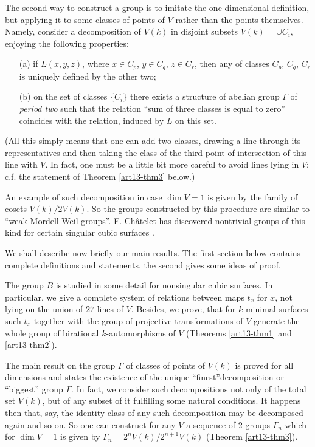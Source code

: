 The second way to construct a group is to imitate the one-dimensional definition, but applying it to some classes of points of $V$ rather than the points themselves. Namely, consider a decomposition of $V(k)$ in disjoint subsets $V(k)=\cup C_{i}$, enjoying the following properties:
\begin{itemize}
\item[(a)] if $L(x,y,z)$, where $x\in C_{p}$, $y\in C_{q}$, $z\in C_{r}$, then any of classes $C_{p}$, $C_{q}$, $C_{r}$ is uniquely defined by the other two;

\item[(b)] on the set of classes $\{C_{i}\}$ there exists a structure of abelian group $\Gamma$ of {\em period two} such that the relation ``sum of three classes is equal to zero'' coincides with the relation, induced by $L$ on this set.
\end{itemize}

(All this simply means that one can add two classes, drawing a line through its representatives and then taking the class of the third point of intersection of this line with $V$. In fact, one must be a little bit more careful to avoid lines lying in $V$: c.f. the statement of Theorem \ref{art13-thm3} below.)

An example of such decomposition in case $\dim V=1$ is given by the family of cosets $V(k)/2V(k)$. So the groups constructed by this procedure are similar to ``weak Mordell-Weil groups''. F. Ch\^atelet has discovered nontrivial groups of this kind for certain singular cubic surfaces \cite{art13-key1}.

We shall describe now briefly our main results. The first section below contains complete definitions and statements, the second gives some ideas of proof.

The group $B$ is studied in some detail for nonsingular cubic surfaces. In particular, we give a complete system of relations between maps $t_{x}$ for $x$, not lying on the union of $27$ lines of $V$. Besides, we prove, that for $k$-minimal surfaces such $t_{x}$ together with the group of projective transformations of $V$ generate the whole group of birational $k$-automorphisms of $V$ (Theorems \ref{art13-thm1} and \ref{art13-thm2}).

The main result on the group $\Gamma$ of classes of points of $V(k)$ is proved for all dimensions and states the existence of the unique ``finest''\pageoriginale decomposition or ``biggest'' group $\Gamma$. In fact, we consider such decompositions not only of the total set $V(k)$, but of any subset of it fulfilling some natural conditions. It happens then that, say, the identity class of any such decomposition may be decomposed again and so on. So one can construct for any $V$ a sequence of $2$-groups $\Gamma_{n}$ which for $\dim V=1$ is given by $\Gamma_{n}=2^{n}V(k)/2^{n+1}V(k)$ (Theorem \ref{art13-thm3}).


